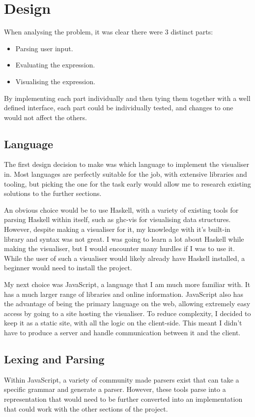 \section{Design} \label{design}

When analysing the problem, it was clear there were 3 distinct parts:
\begin{itemize}
    \item Parsing user input.
    \item Evaluating the expression.
    \item Visualising the expression.
\end{itemize}
By implementing each part individually and then tying them together with a well defined interface, each part could be individually tested, and changes to one would not affect the others.

\subsection{Language}
The first design decision to make was which language to implement the visualiser in. Most languages are perfectly suitable for the job, with extensive libraries and tooling, but picking the one for the task early would allow me to research existing solutions to the further sections.

An obvious choice would be to use Haskell, with a variety of existing tools for parsing Haskell within itself, such as ghc-vis for visualising data structures. However, despite making a visualiser for it, my knowledge with it's built-in library and syntax was not great. I was going to learn a lot about Haskell while making the visualiser, but I would encounter many hurdles if I was to use it. While the user of such a visualiser would likely already have Haskell installed, a beginner would need to install the project.

My next choice was JavaScript, a language that I am much more familiar with. It has a much larger range of libraries and online information. JavaScript also has the advantage of being the primary language on the web, allowing extremely easy access by going to a site hosting the visualiser.
To reduce complexity, I decided to keep it as a static site, with all the logic on the client-side. This meant I didn't have to produce a server and handle communication between it and the client.

\subsection{Lexing and Parsing}
Within JavaScript, a variety of community made parsers exist \cite{antlr4,ohmjs} that can take a specific grammar and generate a parser. However, these tools parse into a representation that would need to be further converted into an implementation that could work with the other sections of the project.

